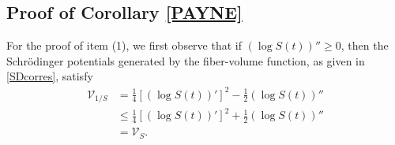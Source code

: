 \documentclass{amsart}
\theoremstyle{definition}
\theoremstyle{remark}
\numberwithin{equation}{section}
\begin{document}
\subsection{Proof of Corollary \ref{PAYNE}} For the proof of item (1), we first observe that if $(\log S(t))''\geq 0$, then the Schr\"{o}dinger potentials generated by the fiber-volume function,
as given in \eqref{SDcorres}, satisfy
\begin{equation}\label{ine}
\begin{aligned}
\mathcal{V}_{1/S}
&= \frac{1}{4}\left[(\log S(t))'\right]^2
-\frac{1}{2}(\log S(t))'' \\
&\leq
\frac{1}{4}\left[(\log S(t))'\right]^2
+\frac{1}{2}(\log S(t))'' \\
&= \mathcal{V}_{S}.
\end{aligned}
\end{equation}
\end{document}
